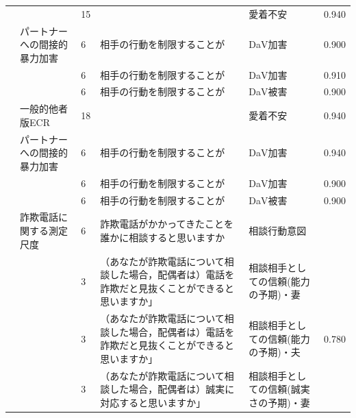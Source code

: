 \begin{landscape}
\begin{longtable}{p{2cm}p{2cm}p{2cm}p{6cm}p{2cm}p{2cm}}
                                 &                                  & 15  &                                                     & 愛着不安                 & 0.940   \\
                                 & パートナーへの間接的暴力加害                   & 6   & 相手の行動を制限することが                                       & DaV加害                & 0.900   \\
                                 &                                  & 6   & 相手の行動を制限することが                                       & DaV加害                & 0.910   \\
                                 &                                  & 6   & 相手の行動を制限することが                                       & DaV被害                & 0.900   \\
                                 & 一般的他者版ECR                        & 18  &                                                     & 愛着不安                 & 0.940   \\
                                 & パートナーへの間接的暴力加害                   & 6   & 相手の行動を制限することが                                       & DaV加害                & 0.940   \\
                                 &                                  & 6   & 相手の行動を制限することが                                       & DaV加害                & 0.900   \\
                                 &                                  & 6   & 相手の行動を制限することが                                       & DaV被害                & 0.900   \\
        \citet{Moroi202192}      & 詐欺電話に関する測定尺度                     & 6   & 詐欺電話がかかってきたことを誰かに相談すると思いますか                         & 相談行動意図               &         \\
                                 &                                  & 3   & （あなたが詐欺電話について相談した場合，配偶者は）電話を詐欺だと見抜くことができると思いますか」    & 相談相手としての信頼(能力の予期)・妻  &         \\
                                 &                                  & 3   & （あなたが詐欺電話について相談した場合，配偶者は）電話を詐欺だと見抜くことができると思いますか」    & 相談相手としての信頼(能力の予期)・夫  & 0.780   \\
                                 &                                  & 3   & （あなたが詐欺電話について相談した場合，配偶者は）誠実に対応すると思いますか」             & 相談相手としての信頼(誠実さの予期)・妻 &         \\

\end{longtable}
\end{landscape}
